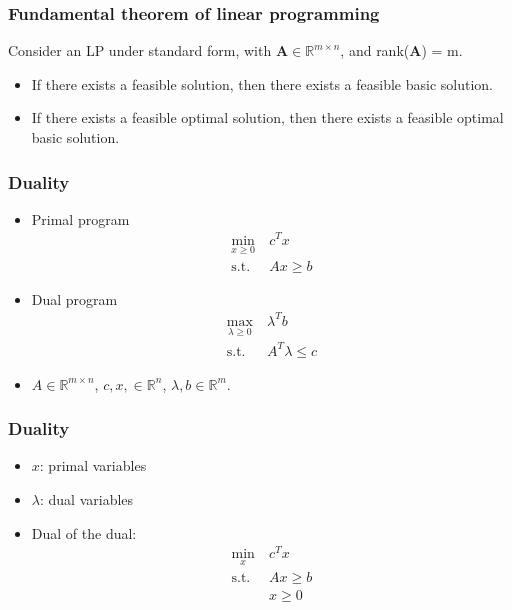 \documentclass{beamer}
\def\RR{\mathcal{R}}
\def\bA{\boldsymbol{A}}
\def\RR{\mathbb{R}}
\begin{document}
\begin{frame}
	\frametitle{Fundamental theorem of linear programming}

Consider an LP under standard form, with $\bA \in \RR^{m \times n}$, and rank($\bA$) = m.
	\begin{itemize}
		\item
		If there exists a feasible solution, then there exists a feasible basic solution.
		\item
		If there exists a feasible optimal solution, then there exists a feasible optimal basic solution.
	\end{itemize}

\end{frame}
\begin{frame}
	\frametitle{Duality}

\begin{itemize}
	\item 
{\red Primal} program
\begin{equation}
	\begin{aligned}
	\min_{x \geq 0} \ & c^T x \\
	\mbox{s.t. } & Ax \geq b
	\end{aligned}
\tag{P}\label{eq:primal}
\end{equation}
\item
{\red Dual} program
\begin{equation}
	\begin{aligned}
	\max_{\lambda \geq 0} \ & \lambda^T b \\
	\mbox{s.t. } & A^T \lambda \leq c
	\end{aligned}
\tag{D}\label{eq:dual}
\end{equation}
\item
$A \in \RR^{m \times n}$, $c, x, \in \RR^n$, $\lambda, b \in \RR^m$.
\end{itemize}
\end{frame}

\begin{frame}
	\frametitle{Duality}

\begin{itemize}
	\item 
	$x$: primal variables
	\item
	$\lambda$: dual variables
\item 	
	Dual of the dual:
	\begin{align*}
		\min_x \ & c^T x \\
		\mbox{s.t. } & Ax \geq b \\
		& x \geq 0
	\end{align*}
\end{itemize}
	
\end{frame}
\end{document}
